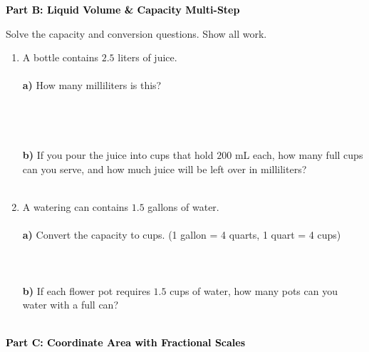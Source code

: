 \documentclass[12pt, letterpaper, fleqn]{article}
\newcommand{\blanklong}{\underline{\hspace{6.5cm}}}
\begin{document}
\newpage

\begin{tcolorbox}[colback=black!10]
    \large\textcolor{black}{\textbf{Part B: Liquid Volume \& Capacity Multi-Step}}
\end{tcolorbox}

\vspace{3mm}

\noindent
Solve the capacity and conversion questions. Show all work.

\vspace{5mm}

\begin{enumerate}[itemsep=3cm, leftmargin=0.6cm]
\item A bottle contains $2.5$ liters of juice. \\ \\
\textbf{a)} How many milliliters is this? \\ \\
\blanklong \\ \\ \\
\textbf{b)} If you pour the juice into cups that hold $200$ mL each, how many full cups can you serve, and how much juice will be left over in milliliters? \\ \\
\blanklong 

\item A watering can contains $1.5$ gallons of water. \\ \\
\textbf{a)} Convert the capacity to cups. (1 gallon = 4 quarts, 1 quart = 4 cups) \\ \\
\blanklong \\ \\
\textbf{b)} If each flower pot requires $1.5$ cups of water, how many pots can you water with a full can? \\ \\
\blanklong
\end{enumerate}

\newpage

\begin{tcolorbox}[colback=black!10]
    \large\textcolor{black}{\textbf{Part C: Coordinate Area with Fractional Scales}}
\end{tcolorbox}
\end{document}

